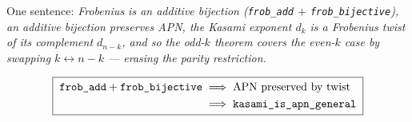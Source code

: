 \documentclass[11pt]{article}
\begin{document}
\bigskip
\noindent
One sentence: \;\emph{Frobenius is an additive bijection
(\texttt{frob\_add} $+$ \texttt{frob\_bijective}), an additive bijection
preserves APN, the Kasami exponent $d_k$ is a Frobenius twist of its
complement $d_{n-k}$, and so the odd-$k$ theorem covers the even-$k$ case by
swapping $k \leftrightarrow n-k$ --- erasing the parity restriction.}

\[
\boxed{\;
\begin{aligned}
&\texttt{frob\_add} + \texttt{frob\_bijective}
\;\Longrightarrow\; \text{APN preserved by twist}\\
&\hphantom{\texttt{frob\_add} + \texttt{frob\_bijective}\;}
\Longrightarrow\; \texttt{kasami\_is\_apn\_general}
\end{aligned}
\;}
\]
\end{document}
